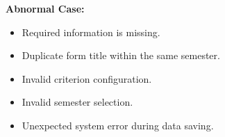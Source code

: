 \vspace{0.2cm}

\textbf{Abnormal Case:}

\begin{itemize}
    \item Required information is missing.
    \item Duplicate form title within the same semester.
    \item Invalid criterion configuration.
    \item Invalid semester selection.
    \item Unexpected system error during data saving.
\end{itemize}




